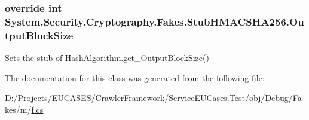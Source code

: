 \hypertarget{class_system_1_1_security_1_1_cryptography_1_1_fakes_1_1_stub_h_m_a_c_s_h_a256_a44bae4a91a1f041b812955c885f887fd}{
\subsubsection[{Output\-Block\-Size}]{\setlength{\rightskip}{0pt plus 5cm}override int System.\-Security.\-Cryptography.\-Fakes.\-Stub\-H\-M\-A\-C\-S\-H\-A256.\-Output\-Block\-Size\hspace{0.3cm}{\ttfamily [get]}}}\label{class_system_1_1_security_1_1_cryptography_1_1_fakes_1_1_stub_h_m_a_c_s_h_a256_a44bae4a91a1f041b812955c885f887fd}


Sets the stub of Hash\-Algorithm.\-get\-\_\-\-Output\-Block\-Size()



The documentation for this class was generated from the following file\-:\begin{DoxyCompactItemize}
\item 
D\-:/\-Projects/\-E\-U\-C\-A\-S\-E\-S/\-Crawler\-Framework/\-Service\-E\-U\-Cases.\-Test/obj/\-Debug/\-Fakes/m/\hyperlink{m_2f_8cs}{f.\-cs}\end{DoxyCompactItemize}
